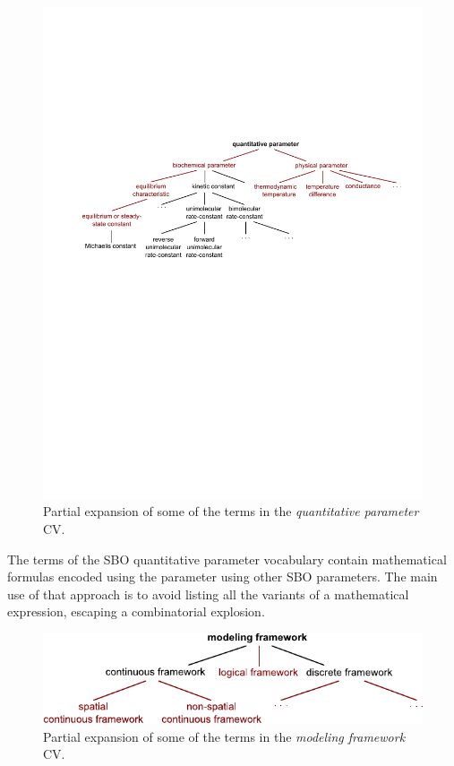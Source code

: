 \begin{figure}[tbh]
  \vspace*{2ex}
  \centering
  \includegraphics[scale = 0.7]{figs/sbo-quantitative-parameter}
  \caption{Partial expansion of some of the terms in the \emph{quantitative
      parameter} CV.}
  \label{fig:expanded-parameter}
\end{figure}

\begin{blockChanged}

The terms of the SBO quantitative parameter vocabulary contain
mathematical formulas encoded using \mathmltwo
{} the parameter using other SBO parameters.  The
main use of that approach is to avoid listing all the variants of a
mathematical expression, escaping a combinatorial explosion.

\end{blockChanged}

\begin{figure}[tbh]
  \vspace*{1ex}
  \centering
  \includegraphics[scale = 0.9]{figs/sbo-framework}
  \vspace*{-2ex}
  \caption{Partial expansion of some of the terms in the
    \emph{modeling framework} CV.}
  \label{fig:expanded-framework}
\end{figure}


